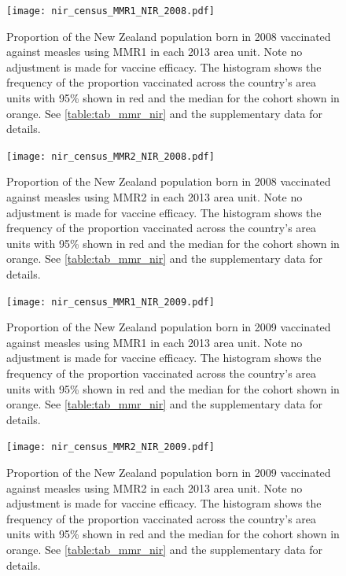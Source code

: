 \documentclass{article}
\begin{document}
\begin{figure}
\begin{center}
    \texttt{[image: nir\_census\_MMR1\_NIR\_2008.pdf]}
\end{center}
    \caption{Proportion of the New Zealand population born in 2008 vaccinated against measles using MMR1 in each 2013 area unit. Note no adjustment is made for vaccine efficacy. The histogram shows the frequency of the proportion vaccinated across the country's area units with 95\% shown in red and the median for the cohort shown in orange. See \autoref{table:tab_mmr_nir} and the supplementary data for details.}
\label{fig:fig12008}
\end{figure}


\begin{figure}
\begin{center}
    \texttt{[image: nir\_census\_MMR2\_NIR\_2008.pdf]}
 \end{center}
    \caption{Proportion of the New Zealand population born in 2008 vaccinated against measles using MMR2 in each 2013 area unit. Note no adjustment is made for vaccine efficacy. The histogram shows the frequency of the proportion vaccinated across the country's area units with 95\% shown in red and the median for the cohort shown in orange. See \autoref{table:tab_mmr_nir} and the supplementary data for details.}
\label{fig:fig22008}
\end{figure}


\begin{figure}
\begin{center}
    \texttt{[image: nir\_census\_MMR1\_NIR\_2009.pdf]}
 \end{center}
    \caption{Proportion of the New Zealand population born in 2009 vaccinated against measles using MMR1 in each 2013 area unit. Note no adjustment is made for vaccine efficacy. The histogram shows the frequency of the proportion vaccinated across the country's area units with 95\% shown in red and the median for the cohort shown in orange. See \autoref{table:tab_mmr_nir} and the supplementary data for details.}
\label{fig:fig12009}
\end{figure}


\begin{figure}
\begin{center}
    \texttt{[image: nir\_census\_MMR2\_NIR\_2009.pdf]}
 \end{center}
    \caption{Proportion of the New Zealand population born in 2009 vaccinated against measles using MMR2 in each 2013 area unit. Note no adjustment is made for vaccine efficacy. The histogram shows the frequency of the proportion vaccinated across the country's area units with 95\% shown in red and the median for the cohort shown in orange. See \autoref{table:tab_mmr_nir} and the supplementary data for details.}
\label{fig:fig22009}
\end{figure}
\end{document}
